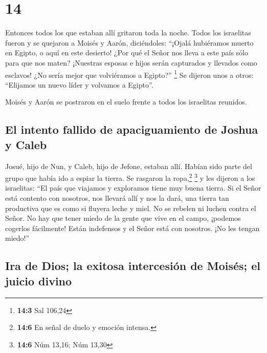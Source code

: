 \hypertarget{section-13}{%
\section{14}\label{section-13}}

 Entonces todos los que estaban allí gritaron toda la
noche.  Todos los israelitas fueron y se quejaron a Moisés
y Aarón, diciéndoles: ``¡Ojalá hubiéramos muerto en Egipto, o aquí en
este desierto!  ¿Por qué el Señor nos lleva a este país
sólo para que nos maten? ¡Nuestras esposas e hijos serán capturados y
llevados como esclavos! ¿No sería mejor que volviéramos a Egipto?''
\footnote{\textbf{14:3} Sal 106,24}  Se dijeron unos a
otros: ``Elijamos un nuevo líder y volvamos a Egipto''.

 Moisés y Aarón se postraron en el suelo frente a todos
los israelitas reunidos.

\hypertarget{el-intento-fallido-de-apaciguamiento-de-joshua-y-caleb}{%
\subsection{El intento fallido de apaciguamiento de Joshua y
Caleb}\label{el-intento-fallido-de-apaciguamiento-de-joshua-y-caleb}}

 Josué, hijo de Nun, y Caleb, hijo de Jefone, estaban
allí. Habían sido parte del grupo que había ido a espiar la tierra. Se
rasgaron la ropa,\footnote{\textbf{14:6} En señal de duelo y emoción
  intensa.} \footnote{\textbf{14:6} Núm 13,16; Núm 13,30} 
y les dijeron a los israelitas: ``El país que viajamos y exploramos
tiene muy buena tierra.  Si el Señor está contento con
nosotros, nos llevará allí y nos la dará, una tierra tan productiva que
es como si fluyera leche y miel.  No se rebelen ni luchen
contra el Señor. No hay que tener miedo de la gente que vive en el
campo, ¡podemos cogerlos fácilmente! Están indefensos y el Señor está
con nosotros. ¡No les tengan miedo!''

\hypertarget{ira-de-dios-la-exitosa-intercesiuxf3n-de-moisuxe9s-el-juicio-divino}{%
\subsection{Ira de Dios; la exitosa intercesión de Moisés; el juicio
divino}\label{ira-de-dios-la-exitosa-intercesiuxf3n-de-moisuxe9s-el-juicio-divino}}

